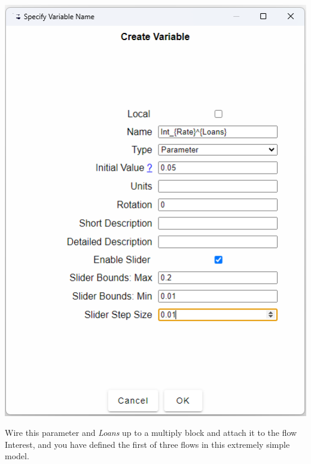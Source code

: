 \noindent\includegraphics{images/MonetaryModel01GodleyTable05DefineFlows03}

Wire this parameter and \emph{Loans }up to a multiply block 
and attach it to the flow Interest, and you have defined the first
of three flows in this extremely simple model.

